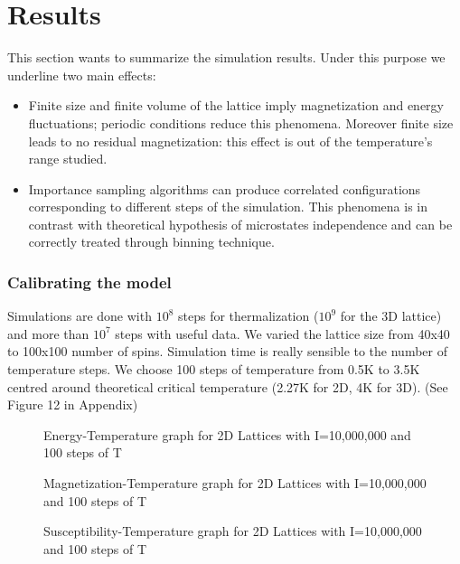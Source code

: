 \documentclass[11pt,a4paper]{article}
\begin{document}
\newpage
\section{Results}
This section wants to summarize the simulation results. Under this purpose we underline two main effects:

\begin{itemize}
\item Finite size and finite volume of the lattice imply magnetization and energy fluctuations; periodic conditions reduce this phenomena. Moreover finite size leads to no residual magnetization: this effect is out of the temperature's range studied.

\item Importance sampling algorithms can produce correlated configurations corresponding to different steps of the simulation. This phenomena is in contrast with theoretical hypothesis of microstates independence and can be correctly treated through binning technique. 
\end{itemize}

\subsubsection*{Calibrating the model}
Simulations are done with $10^8$ steps for thermalization ($10^9$ for the 3D lattice) and more than $10^7$ steps with useful data. We varied the lattice size from 40x40 to 100x100 number of spins. Simulation time is really sensible to the number of temperature steps. We choose 100 steps of temperature from 0.5K to 3.5K centred around theoretical critical temperature (2.27K for 2D, 4K for 3D). (See Figure 12 in Appendix) 

\begin{figure}[h!]
  \centering
  
  \caption{Energy-Temperature graph for 2D Lattices with I=10,000,000 and 100 steps of T}
\end{figure}

\begin{figure}[h!]
  \centering

  \caption{Magnetization-Temperature graph for 2D Lattices with I=10,000,000 and 100 steps of T}
\end{figure}

\begin{figure}[h!]
  \centering
 
  \caption{Susceptibility-Temperature graph for 2D Lattices with I=10,000,000 and 100 steps of T}
\end{figure}
\end{document}
